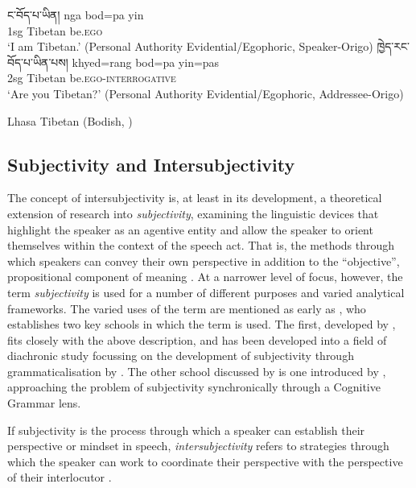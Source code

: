 \begin{exe}
\ex\label{ex:OrigoShift}
\begin{xlist}
\ex\label{ex:OrigoShift:a} \texttibetan{ང་བོད་པ་ཡིན།}
\gll nga bod=pa yin \\
1sg Tibetan be.\textsc{ego} \\
\glt `I am Tibetan.' (Personal Authority Evidential/Egophoric, Speaker-Origo)
\ex\label{ex:OrigoShift:b} \texttibetan{ཁྱེད་རང་བོད་པ་ཡིན་པས།}
\gll khyed=rang bod=pa yin=pas \\
2sg Tibetan be.\textsc{ego}-\textsc{interrogative} \\
\glt `Are you Tibetan?' (Personal Authority Evidential/Egophoric, Addressee-Origo)
\end{xlist}
Lhasa Tibetan (Bodish, \tibetnat) \cite[394]{DeLancey2017Tibetan}
\end{exe}

\subsection{Subjectivity and Intersubjectivity}
The concept of intersubjectivity is, at least in its development, a theoretical extension of research into \textit{subjectivity}, examining the linguistic devices that highlight the speaker as an agentive entity and allow the speaker to orient themselves within the context of the speech act. That is, the methods through which speakers can convey their own perspective in addition to the ``objective'', propositional component of meaning \cite{Finegan1995}. At a narrower level of focus, however, the term \textit{subjectivity} is used for a number of different purposes and varied analytical frameworks. The varied uses of the term are mentioned as early as , who establishes two key schools in which the term is used. The first, developed by , fits closely with the above description, and has been developed into a field of diachronic study focussing on the development of subjectivity through grammaticalisation by . The other school discussed by  is one introduced by , approaching the problem of subjectivity synchronically through a Cognitive Grammar lens.
    
If subjectivity is the process through which a speaker can establish their perspective or mindset in speech, \textit{intersubjectivity} refers to strategies through which the speaker can work to coordinate their perspective with the perspective of their interlocutor \cite{Brems2014}.

